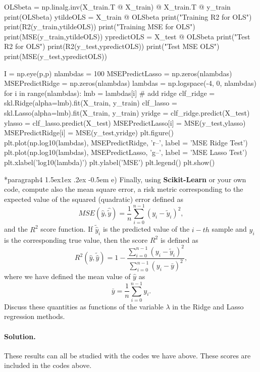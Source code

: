 \documentclass[%
oneside,                 %
final,                   %
10pt]{article}
\makeatletter
\newenvironment{doconceexercise}{}{}
\newcommand\subex{\@startsection*{paragraph}{4}{\z@}%
                  {1.5ex\@plus1ex \@minus.2ex}%
                  {-0.5em}%
                  {\normalfont\normalsize\bfseries}}
\makeatother
\begin{document}
\begin{doconceexercise}
OLSbeta = np.linalg.inv(X_train.T @ X_train) @ X_train.T @ y_train
print(OLSbeta)
ytildeOLS = X_train @ OLSbeta
print("Training R2 for OLS")
print(R2(y_train,ytildeOLS))
print("Training MSE for OLS")
print(MSE(y_train,ytildeOLS))
ypredictOLS = X_test @ OLSbeta
print("Test R2 for OLS")
print(R2(y_test,ypredictOLS))
print("Test MSE OLS")
print(MSE(y_test,ypredictOLS))

I = np.eye(p,p)
nlambdas = 100
MSEPredictLasso = np.zeros(nlambdas)
MSEPredictRidge = np.zeros(nlambdas)
lambdas = np.logspace(-4, 0, nlambdas)
for i in range(nlambdas):
    lmb = lambdas[i]
    # add ridge
    clf_ridge = skl.Ridge(alpha=lmb).fit(X_train, y_train)
    clf_lasso = skl.Lasso(alpha=lmb).fit(X_train, y_train)
    yridge = clf_ridge.predict(X_test)
    ylasso = clf_lasso.predict(X_test)
    MSEPredictLasso[i] = MSE(y_test,ylasso)
    MSEPredictRidge[i] = MSE(y_test,yridge)
plt.figure()
plt.plot(np.log10(lambdas), MSEPredictRidge, 'r--', label = 'MSE Ridge Test')
plt.plot(np.log10(lambdas), MSEPredictLasso, 'g--', label = 'MSE Lasso Test')
plt.xlabel('log10(lambda)')
plt.ylabel('MSE')
plt.legend()
plt.show()


\subex{e)}
Finally, using \textbf{Scikit-Learn} or your own code, compute also the mean square error, a risk metric corresponding to the expected value of the squared (quadratic) error defined as
\[ MSE(\hat{y},\hat{\tilde{y}}) = \frac{1}{n}
\sum_{i=0}^{n-1}(y_i-\tilde{y}_i)^2, 
\] 
and the $R^2$ score function.
If $\tilde{\hat{y}}_i$ is the predicted value of the $i-th$ sample and $y_i$ is the corresponding true value, then the score $R^2$ is defined as
\[
R^2(\hat{y}, \tilde{\hat{y}}) = 1 - \frac{\sum_{i=0}^{n - 1} (y_i - \tilde{y}_i)^2}{\sum_{i=0}^{n - 1} (y_i - \bar{y})^2},
\]
where we have defined the mean value  of $\hat{y}$ as
\[
\bar{y} =  \frac{1}{n} \sum_{i=0}^{n - 1} y_i.
\]
Discuss these quantities as functions of the variable $\lambda$ in the Ridge and Lasso regression methods.

\paragraph{Solution.}
These results can all be studied with the codes we have above. These scores are included in the codes above.


\end{doconceexercise}
\end{document}
